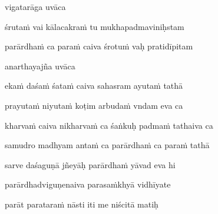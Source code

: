 vigatarāga uvāca~{\dandab}\dontdisplaylinenum 

śrutaṁ vai kālacakraṁ tu mukhapadmaviniḥstam\thinspace{\danda} \dontdisplaylinenum

parārdhaṁ ca paraṁ caiva śrotuṁ vaḥ pratidīpitam \veg\dontdisplaylinenum
{}

anarthayajña uvāca~{\dandab}\dontdisplaylinenum 
{}

ekaṁ daśaṁ śataṁ caiva sahasram ayutaṁ tathā\thinspace{\danda} \dontdisplaylinenum

prayutaṁ niyutaṁ koṭim arbudaṁ vndam eva ca \veg\dontdisplaylinenum
{}

kharvaṁ caiva nikharvaṁ ca śaṅkuḥ padmaṁ tathaiva ca\thinspace{\dandab} \dontdisplaylinenum

samudro madhyam antaṁ ca parārdhaṁ ca paraṁ tathā \veg\dontdisplaylinenum
{}

sarve daśaguṇā jñeyāḥ parārdhaṁ yāvad eva hi\thinspace{\dandab} \dontdisplaylinenum

parārdhadviguṇenaiva parasaṁkhyā vidhīyate \veg\dontdisplaylinenum
{}

parāt parataraṁ nāsti iti me niścitā matiḥ\thinspace{\dandab} \dontdisplaylinenum

